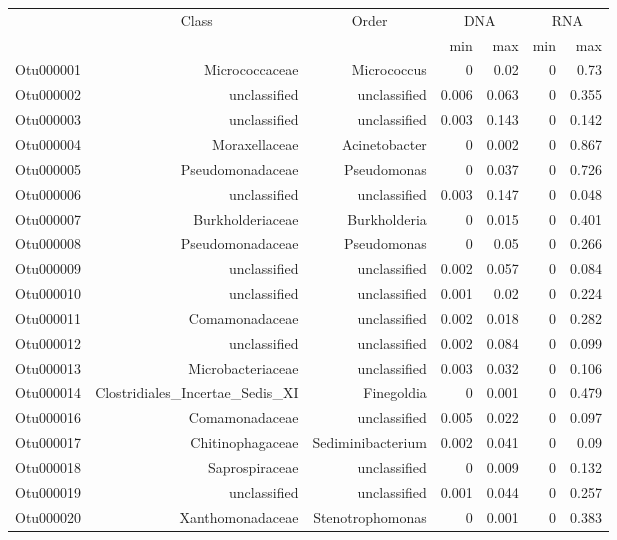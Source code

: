 \begin{table}[ht]
\centering
\begin{tabular}{crrrrrr}
  \hline
  & \multicolumn{1}{c}{Class} & \multicolumn{1}{c}{Order} & 
                      \multicolumn{2}{c}{DNA} & \multicolumn{2}{c}{RNA} \\
 & &  & min & max & min & max \\
 \hline
Otu000001 & Micrococcaceae & Micrococcus & 0 & 0.02 & 0 & 0.73 \\ 
  Otu000002 & unclassified & unclassified & 0.006 & 0.063 & 0 & 0.355 \\ 
  Otu000003 & unclassified & unclassified & 0.003 & 0.143 & 0 & 0.142 \\ 
  Otu000004 & Moraxellaceae & Acinetobacter & 0 & 0.002 & 0 & 0.867 \\ 
  Otu000005 & Pseudomonadaceae & Pseudomonas & 0 & 0.037 & 0 & 0.726 \\ 
  Otu000006 & unclassified & unclassified & 0.003 & 0.147 & 0 & 0.048 \\ 
  Otu000007 & Burkholderiaceae & Burkholderia & 0 & 0.015 & 0 & 0.401 \\ 
  Otu000008 & Pseudomonadaceae & Pseudomonas & 0 & 0.05 & 0 & 0.266 \\ 
  Otu000009 & unclassified & unclassified & 0.002 & 0.057 & 0 & 0.084 \\ 
  Otu000010 & unclassified & unclassified & 0.001 & 0.02 & 0 & 0.224 \\ 
  Otu000011 & Comamonadaceae & unclassified & 0.002 & 0.018 & 0 & 0.282 \\ 
  Otu000012 & unclassified & unclassified & 0.002 & 0.084 & 0 & 0.099 \\ 
  Otu000013 & Microbacteriaceae & unclassified & 0.003 & 0.032 & 0 & 0.106 \\ 
  Otu000014 & Clostridiales\_Incertae\_Sedis\_XI & Finegoldia & 0 & 0.001 & 0 & 0.479 \\ 
  Otu000016 & Comamonadaceae & unclassified & 0.005 & 0.022 & 0 & 0.097 \\ 
  Otu000017 & Chitinophagaceae & Sediminibacterium & 0.002 & 0.041 & 0 & 0.09 \\ 
  Otu000018 & Saprospiraceae & unclassified & 0 & 0.009 & 0 & 0.132 \\ 
  Otu000019 & unclassified & unclassified & 0.001 & 0.044 & 0 & 0.257 \\ 
  Otu000020 & Xanthomonadaceae & Stenotrophomonas & 0 & 0.001 & 0 & 0.383 \\ 

\end{tabular}
\end{table}
